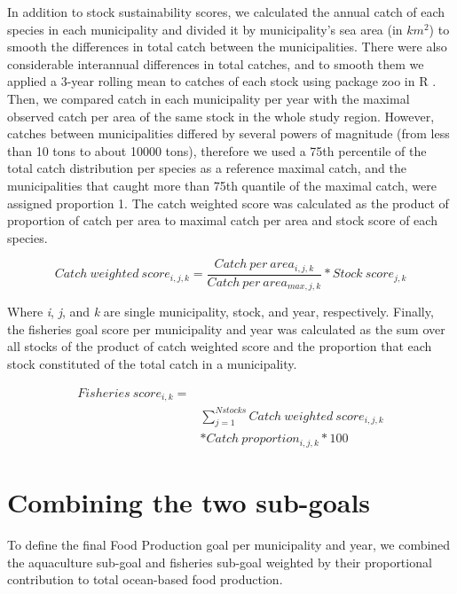\documentclass[
]{book}
\begin{document}
In addition to stock sustainability scores, we calculated the annual catch of each species in each municipality and divided it by municipality's sea area (in \(km^2\)) to smooth the differences in total catch between the municipalities. There were also considerable interannual differences in total catches, and to smooth them we applied a 3-year rolling mean to catches of each stock using package zoo in R \citep{zeileis2005zoo}. Then, we compared catch in each municipality per year with the maximal observed catch per area of the same stock in the whole study region. However, catches between municipalities differed by several powers of magnitude (from less than 10 tons to about 10000 tons), therefore we used a 75th percentile of the total catch distribution per species as a reference maximal catch, and the municipalities that caught more than 75th quantile of the maximal catch, were assigned proportion 1.
The catch weighted score was calculated as the product of proportion of catch per area to maximal catch per area and stock score of each species.

\begin{equation}
Catch\ weighted \ score_{i,j, k} = \frac{Catch\ per\ area_{i,j,k}}{Catch\ per\ area_{max,j,k}}*Stock\ score_{j,k}
\label{eq:catchweight} 
\end{equation}

Where \emph{i}, \emph{j}, and \emph{k} are single municipality, stock, and year, respectively.
Finally, the fisheries goal score per municipality and year was calculated as the sum over all stocks of the product of catch weighted score and the proportion that each stock constituted of the total catch in a municipality.

\begin{equation}
\begin{aligned}
 Fisheries\ score_{i,k} = \\
 & \sum_{j = 1}^{N stocks}Catch\ weighted\ score_{i,j,k}\\
 & * Catch\ proportion_{i,j,k}* 100
 \end{aligned}
  \label{eq:fishscore} 
\end{equation}

\hypertarget{combining-the-two-sub-goals}{%
\section{Combining the two sub-goals}\label{combining-the-two-sub-goals}}

To define the final Food Production goal per municipality and year, we combined the aquaculture sub-goal and fisheries sub-goal weighted by their proportional contribution to total ocean-based food production.
\end{document}
